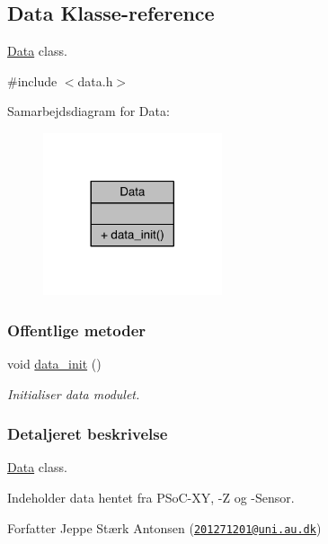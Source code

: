 \hypertarget{class_data}{}\subsection{Data Klasse-\/reference}
\label{class_data}


\hyperlink{class_data}{Data} class.  




{\ttfamily \#include $<$data.\+h$>$}



Samarbejdsdiagram for Data\+:\nopagebreak
\begin{figure}[H]
\begin{center}
\leavevmode
\includegraphics[width=149pt]{class_data__coll__graph}
\end{center}
\end{figure}
\subsubsection*{Offentlige metoder}
\begin{DoxyCompactItemize}
\item 
void \hyperlink{class_data_a68c6d4c829f9363c7d9ff2efbbca50c1}{data\+\_\+init} ()
\begin{DoxyCompactList}\small\item\em Initialiser data modulet. \end{DoxyCompactList}\end{DoxyCompactItemize}


\subsubsection{Detaljeret beskrivelse}
\hyperlink{class_data}{Data} class. 

Indeholder data hentet fra P\+So\+C-\/\+XY, -\/Z og -\/\+Sensor. \begin{DoxyAuthor}{Forfatter}
Jeppe Stærk Antonsen (\href{mailto:201271201@uni.au.dk}{\tt 201271201@uni.\+au.\+dk}) 
\end{DoxyAuthor}


